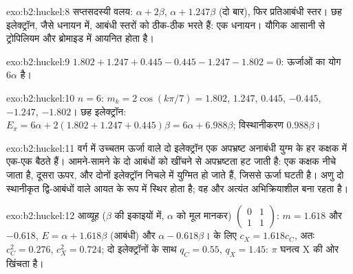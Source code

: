\begin{solution}{exo:b2:huckel:8}
सप्तसदस्यी वलय: $\alpha + 2\beta$, $\alpha + 1.247\beta$ (दो बार), फिर प्रतिआबंधी स्तर। छह
इलेक्ट्रॉन, जैसे धनायन  में, आबंधी स्तरों को ठीक-ठीक भरते हैं: एक 
धनायन। यौगिक आसानी से ट्रोपिलियम और ब्रोमाइड में आयनित होता है।
\end{solution}

\begin{solution}{exo:b2:huckel:9}
$1.802 + 1.247 + 0.445 - 0.445 - 1.247 - 1.802 = 0$: ऊर्जाओं का योग $6\alpha$ है।
\end{solution}

\begin{solution}{exo:b2:huckel:10}
$n = 6$: $m_k = 2\cos(k\pi/7) = 1.802$, $1.247$, $0.445$, $-0.445$, $-1.247$, $-1.802$। छह
इलेक्ट्रॉन: $E_\pi = 6\alpha + 2(1.802 + 1.247 + 0.445)\beta = 6\alpha + 6.988\beta$;
विस्थानीकरण $0.988\beta$।
\end{solution}

\begin{solution}{exo:b2:huckel:11}
वर्ग में उच्चतम ऊर्जा वाले दो इलेक्ट्रॉन एक अपभ्रष्ट अनाबंधी युग्म के हर कक्षक में
एक-एक बैठते हैं। आमने-सामने के दो आबंधों को खींचने से अपभ्रष्टता हट जाती है:
एक कक्षक नीचे जाता है, दूसरा ऊपर, और दोनों इलेक्ट्रॉन निचले में युग्मित हो जाते हैं, जिससे
ऊर्जा घटती है। अणु दो स्थानीकृत द्वि-आबंधों वाले आयत के रूप में स्थिर होता है;
वह  और अत्यंत अभिक्रियाशील बना रहता है।
\end{solution}

\begin{solution}{exo:b2:huckel:12}
आव्यूह ($\beta$ की इकाइयों में, $\alpha$ को मूल मानकर) $\begin{pmatrix}0 & 1\\ 1 & 1\end{pmatrix}$:
$m = 1.618$ और $-0.618$, $E = \alpha + 1.618\beta$ (आबंधी) और $\alpha - 0.618\beta$।
 के लिए $c_X = 1.618c_C$, अतः $c_C^2 = 0.276$, $c_X^2 = 0.724$; दो इलेक्ट्रॉनों के साथ
$q_C = 0.55$, $q_X = 1.45$: $\pi$ घनत्व X की ओर खिंचता है।
\end{solution}

